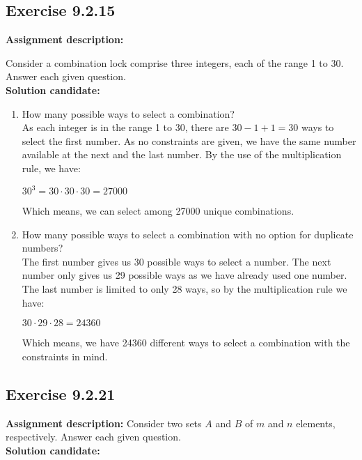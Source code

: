 \documentclass{report}
\newcommand{\cent}[1]{\begin{center}#1\end{center}}
\newcommand{\assignmentDescription}{\textbf{Assignment description: }}
\newcommand{\solution}{\textbf{Solution candidate: }}
\newcommand{\Exercise}[1]{\subsection{Exercise #1}}
\newcommand{\defaultEnumerateLabel}{\textbf{\alph*.}}
\newcommand{\myItem}[1]{\item #1\\}
\begin{document}
 	\Exercise{9.2.15}
 	
 	\assignmentDescription
 	
 	Consider a combination lock comprise three integers, each of the range 1 to 30. Answer each given question.\\
 	
 	\solution
 	
 	\begin{enumerate}[label=\defaultEnumerateLabel]
 		\myItem{How many possible ways to select a combination?}
 		
 		As each integer is in the range 1 to 30, there are $30-1+1 = 30$ ways to select the first number. As no constraints are given, we have the same number available at the next and the last number. By the use of the multiplication rule, we have:
 		
 		\cent{$30^3 = 30 \cdot 30 \cdot 30 = 27000$}
 		
 		Which means, we can select among 27000 unique combinations.\\
 		
 		\myItem{How many possible ways to select a combination with no option for duplicate numbers?}
 		
 		The first number gives us 30 possible ways to select a number. The next number only gives us 29 possible ways as we have already used one number. The last number is limited to only 28 ways, so by the multiplication rule we have:
 		
 		
 		\cent{$30 \cdot 29 \cdot 28 = 24360$}
 		
 		Which means, we have 24360 different ways to select a combination with the constraints in mind.\\
 		
 	\end{enumerate}
 	\Exercise{9.2.21}
 	
 	\assignmentDescription
 	Consider two sets $A$ and $B$ of $m$ and $n$ elements, respectively. Answer each given question.\\
 	
 	\solution
 	
\end{document}
